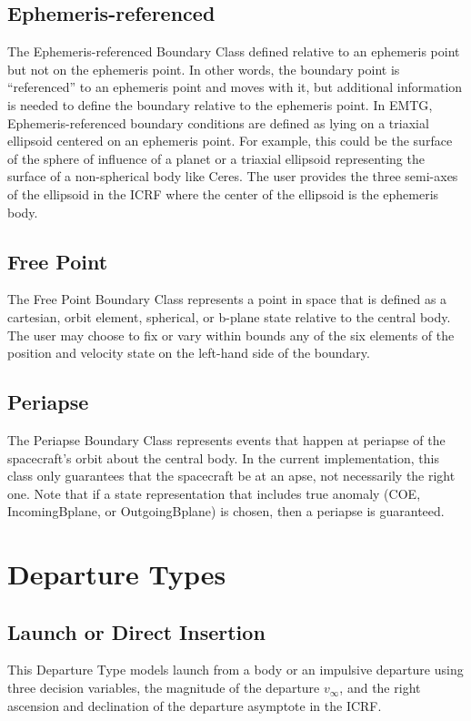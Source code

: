     \subsection{Ephemeris-referenced}
    \label{sec:ephem_referenced}
    The Ephemeris-referenced Boundary Class defined relative to an ephemeris point but not on the ephemeris point. In other words, the boundary point is ``referenced'' to an ephemeris point and moves with it, but additional information is needed to define the boundary relative to the ephemeris point. In \ac{EMTG}, Ephemeris-referenced boundary conditions are defined as lying on a triaxial ellipsoid centered on an ephemeris point. For example, this could be the surface of the sphere of influence of a planet or a triaxial ellipsoid representing the surface of a non-spherical body like Ceres. The user provides the three semi-axes of the ellipsoid in the \ac{ICRF} where the center of the ellipsoid is the ephemeris body.

    \subsection{Free Point}
    \label{sec:free_point}
    The Free Point Boundary Class represents a point in space that is defined as a cartesian, orbit element, spherical, or b-plane state relative to the central body. The user may choose to fix or vary within bounds any of the six elements of the position and velocity state on the left-hand side of the boundary. 

    \subsection{Periapse}
    \label{sec:periapse_boundary}
    The Periapse Boundary Class represents events that happen at periapse of the spacecraft's orbit about the central body. In the current implementation, this class only guarantees that the spacecraft be at an apse, not necessarily the right one. Note that if a state representation that includes true anomaly (\ac{COE}, IncomingBplane, or OutgoingBplane) is chosen, then a periapse is guaranteed.

\section{Departure Types}
\label{sec:departure_boundaries}

    \subsection{Launch or Direct Insertion}
    \label{sec:launch_or_direct_insertion} 
    This Departure Type models launch from a body or an impulsive departure using three decision variables, the magnitude of the departure $v_{\infty}$, and the right ascension and declination of the departure asymptote in the \ac{ICRF}. 


